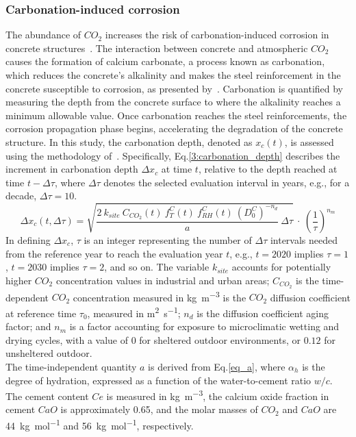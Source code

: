 \subsubsection{Carbonation-induced corrosion}\label{Carbonation_corrosion_Chpt}
The abundance of $CO_2$ increases the risk of carbonation-induced corrosion in concrete structures~\cite{TALUKDAR_part1,TALUKDAR_part2}. 
The interaction between concrete and atmospheric $CO_2$ causes the formation of calcium carbonate, a process known as carbonation, which reduces the concrete's alkalinity and makes the steel reinforcement in the concrete susceptible to corrosion, as presented by~\textcite{GLASSER2008226}.
Carbonation is quantified by measuring the depth from the concrete surface to where the alkalinity reaches a minimum allowable value. 
Once carbonation reaches the steel reinforcements, the corrosion propagation phase begins, accelerating the degradation of the concrete structure.
In this study, the carbonation depth, denoted as $x_c(t)$, is assessed using the methodology of~\textcite{Carb_eq_STEWART,Carb_eq_BASTIDASARTEAGA}.
Specifically, Eq.\ref{3:carbonation_depth} describes the increment in carbonation depth $\Delta x_c$ at time $t$, relative to the depth reached at time $t-\Delta \tau$, where $\Delta \tau$ denotes the selected evaluation interval in years, e.g., for a decade, $\Delta \tau = 10$.
\begin{equation}
    \label{3:carbonation_depth}
    \Delta x_c(t, \Delta \tau) = \sqrt{\frac{2 \ k_{site} \ C_{CO_2}(t) \ f_T^C(t) \ f_{RH}^C(t) \ (D_0^C)^{-n_d}}{a} \ \Delta \tau} \ \cdot \ \left( \frac{1}{\tau} \right)^{n_m} 
\end{equation}
In defining $\Delta x_c$, $\tau$ is an integer representing the number of $\Delta \tau$ intervals needed from the reference year to reach the evaluation year $t$, e.g., $t = 2020$ implies $\tau = 1$, $t = 2030$ implies $\tau = 2$, and so on.
The variable $k_{site}$ accounts for potentially higher $CO_2$ concentration values in industrial and urban areas; $C_{CO_2}$ is the time-dependent $CO_2$ concentration measured in \si{\kilogram\per\cubic\meter} is the $CO_2$ diffusion coefficient at reference time $\tau_0$, measured in \si{\square\meter\per\second}; $n_d$ is the diffusion coefficient aging factor; and $n_m$ is a factor accounting for exposure to microclimatic wetting and drying cycles, with a value of $0$ for sheltered outdoor environments, or $0.12$ for unsheltered outdoor. \\
The time-independent quantity $a$ is derived from Eq.\ref{eq_a}, where $\alpha_h$ is the degree of hydration, expressed as a function of the water-to-cement ratio $w / c$. The cement content $Ce$ is measured in \si{\kilogram\per\cubic\meter}, the calcium oxide fraction in cement $CaO$ is approximately 0.65, and the molar masses of $CO_2$ and $CaO$ are \SI{44}{\kilogram\per\mole} and \SI{56}{\kilogram\per\mole}, respectively.
